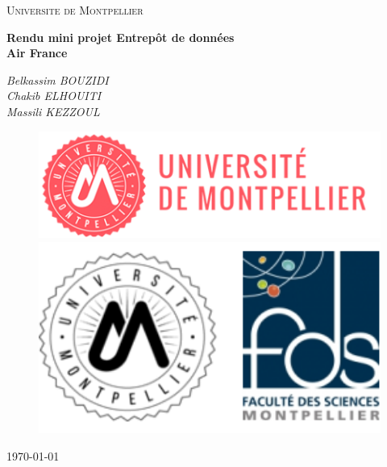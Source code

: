 \documentclass[oneside,13pt,a4paper]{article}
\title{}
\author{
    Belkassim BOUZIDI \and
    Chakib ELHOUITI \and
    Massili KEZZOUL \and
   
}
\date{\today}
\begin{document}
\begin{titlepage}
	\centering
	{\scshape\LARGE Universite de Montpellier\par}
	{\scshape\Large\par}
	\vspace{1.5cm}
	{\huge\bfseries Rendu mini projet Entrepôt de données\\Air France\par}
	\vspace{2cm}
	{\Large\itshape
		Belkassim BOUZIDI \\
		Chakib ELHOUITI \\
		Massili KEZZOUL \\
		
		\par}

	

	

	\vspace{2cm}

	\begin{figure}[h]
		\begin{minipage}[c]{.46\linewidth}
			\centering
			\includegraphics[width=1\textwidth]{img/univ-montpellier.png}
		\end{minipage}
		\hfill%
		\begin{minipage}[c]{.46\linewidth}
			\centering
			\includegraphics[width=1\textwidth]{img/fds.png}
		\end{minipage}
	\end{figure}

	\par\vspace{1cm}

	\vfill

	{\large \today\par}
\end{titlepage}
\end{document}
